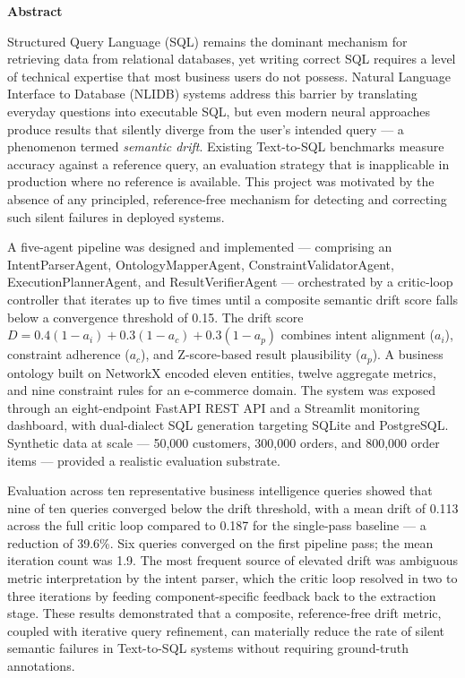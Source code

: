 \vspace{-1cm}

{\centering\Large\bfseries Abstract\par}
\vspace{1em}

Structured Query Language (SQL) remains the dominant mechanism for retrieving data from relational databases, yet writing correct SQL requires a level of technical expertise that most business users do not possess. Natural Language Interface to Database (NLIDB) systems address this barrier by translating everyday questions into executable SQL, but even modern neural approaches produce results that silently diverge from the user's intended query — a phenomenon termed \textit{semantic drift}. Existing Text-to-SQL benchmarks measure accuracy against a reference query, an evaluation strategy that is inapplicable in production where no reference is available. This project was motivated by the absence of any principled, reference-free mechanism for detecting and correcting such silent failures in deployed systems.

A five-agent pipeline was designed and implemented — comprising an IntentParserAgent, OntologyMapperAgent, ConstraintValidatorAgent, ExecutionPlannerAgent, and ResultVerifierAgent — orchestrated by a critic-loop controller that iterates up to five times until a composite semantic drift score falls below a convergence threshold of 0.15. The drift score $D = 0.4(1{-}a_i) + 0.3(1{-}a_c) + 0.3(1{-}a_p)$ combines intent alignment ($a_i$), constraint adherence ($a_c$), and Z-score-based result plausibility ($a_p$). A business ontology built on NetworkX encoded eleven entities, twelve aggregate metrics, and nine constraint rules for an e-commerce domain. The system was exposed through an eight-endpoint FastAPI REST API and a Streamlit monitoring dashboard, with dual-dialect SQL generation targeting SQLite and PostgreSQL. Synthetic data at scale — 50,000 customers, 300,000 orders, and 800,000 order items — provided a realistic evaluation substrate.

Evaluation across ten representative business intelligence queries showed that nine of ten queries converged below the drift threshold, with a mean drift of 0.113 across the full critic loop compared to 0.187 for the single-pass baseline — a reduction of 39.6\%. Six queries converged on the first pipeline pass; the mean iteration count was 1.9. The most frequent source of elevated drift was ambiguous metric interpretation by the intent parser, which the critic loop resolved in two to three iterations by feeding component-specific feedback back to the extraction stage. These results demonstrated that a composite, reference-free drift metric, coupled with iterative query refinement, can materially reduce the rate of silent semantic failures in Text-to-SQL systems without requiring ground-truth annotations.

\pagebreak

